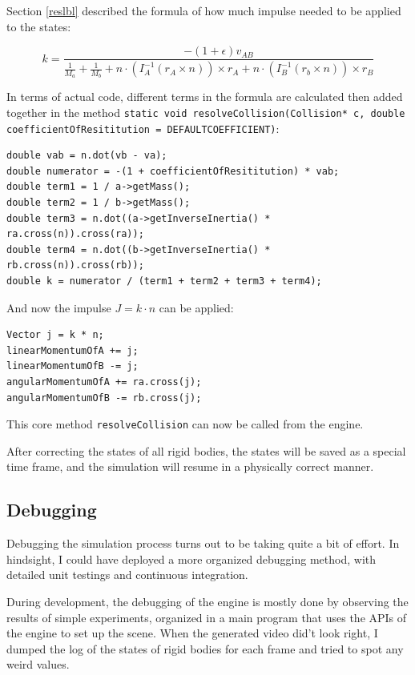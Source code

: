 \documentclass[12pt,a4paper,twoside,openright]{report}
\newcommand{\code}{\texttt}
\begin{document}
Section \ref{reslbl} described the formula of how much impulse needed to be applied to the states:

\begin{equation}
        k=\frac{-(1+\epsilon)v_{AB}}{\frac{1}{M_a}+\frac{1}{M_b}+n\cdot (I_A^{-1}(r_A\times n)) \times r_A + n\cdot (I_B^{-1}(r_b \times n)) \times r_B}
\end{equation}

In terms of actual code, different terms in the formula are calculated then added together in the method \code{static void resolveCollision(Collision* c, double coefficientOfResititution = DEFAULTCOEFFICIENT)}:

\begin{verbatim}
double vab = n.dot(vb - va);
double numerator = -(1 + coefficientOfResititution) * vab;
double term1 = 1 / a->getMass();
double term2 = 1 / b->getMass();
double term3 = n.dot((a->getInverseInertia() * ra.cross(n)).cross(ra));
double term4 = n.dot((b->getInverseInertia() * rb.cross(n)).cross(rb));
double k = numerator / (term1 + term2 + term3 + term4);
\end{verbatim}

And now the impulse $J = k\cdot n$ can be applied:

\begin{verbatim}
Vector j = k * n;
linearMomentumOfA += j;
linearMomentumOfB -= j;
angularMomentumOfA += ra.cross(j);
angularMomentumOfB -= rb.cross(j);
\end{verbatim}

This core method \code{resolveCollision} can now be called from the engine.

After correcting the states of all rigid bodies, the states will be saved as a special time frame, and the simulation will resume in a physically correct manner.

\subsection{Debugging}

Debugging the simulation process turns out to be taking quite a bit of effort. In hindsight, I could have deployed a more organized debugging method, with detailed unit testings and continuous integration.

During development, the debugging of the engine is mostly done by observing the results of simple experiments, organized in a main program that uses the APIs of the engine to set up the scene. When the generated video did't look right, I dumped the log of the states of rigid bodies for each frame and tried to spot any weird values.
\end{document}

